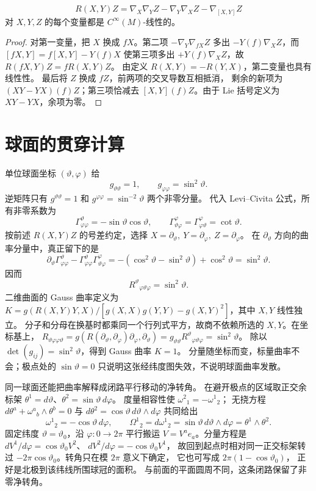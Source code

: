 \begin{proposition}[曲率的张量性]
\[
R(X,Y)Z=\nabla_X\nabla_YZ-\nabla_Y\nabla_XZ-\nabla_{[X,Y]}Z
\]
对 \(X,Y,Z\) 的每个变量都是 \(C^\infty(M)\)-线性的。
\end{proposition}
\begin{proof}
对第一变量，把 \(X\) 换成 \(fX\)。第二项
\(-\nabla_Y\nabla_{fX}Z\) 多出 \(-Y(f)\nabla_XZ\)，而
\([fX,Y]=f[X,Y]-Y(f)X\) 使第三项多出
\(+Y(f)\nabla_XZ\)，故 \(R(fX,Y)Z=fR(X,Y)Z\)。
由定义 \(R(X,Y)=-R(Y,X)\)，第二变量也具有线性性。
最后将 \(Z\) 换成 \(fZ\)，前两项的交叉导数互相抵消，
剩余的新项为 \((XY-YX)(f)Z\)；第三项恰减去
\([X,Y](f)Z\)。由于 Lie 括号定义为 \(XY-YX\)，余项为零。
\end{proof}

\section{球面的贯穿计算}

单位球面坐标 \((\vartheta,\varphi)\) 给
\[
g_{\vartheta\vartheta}=1,\qquad
g_{\varphi\varphi}=\sin^2\vartheta .
\]
逆矩阵只有 \(g^{\vartheta\vartheta}=1\) 和
\(g^{\varphi\varphi}=\sin^{-2}\vartheta\) 两个非零分量。
代入 Levi--Civita 公式，所有非零系数为
\[
\Gamma^\vartheta_{\varphi\varphi}
=-\sin\vartheta\cos\vartheta,\qquad
\Gamma^\varphi_{\vartheta\varphi}
=\Gamma^\varphi_{\varphi\vartheta}=\cot\vartheta.
\]
按前述 \(R(X,Y)Z\) 的号差约定，选择
\(X=\partial_\vartheta,\ Y=\partial_\varphi,\ Z=\partial_\varphi\)。
在 \(\partial_\vartheta\) 方向的曲率分量中，真正留下的是
\[
\partial_\vartheta\Gamma^\vartheta_{\varphi\varphi}
-\Gamma^\vartheta_{\varphi\varphi}
 \Gamma^\varphi_{\vartheta\varphi}
=-(\cos^2\vartheta-\sin^2\vartheta)+\cos^2\vartheta
=\sin^2\vartheta .
\]
因而
\[
R^\vartheta{}_{\varphi\vartheta\varphi}=\sin^2\vartheta.
\]
二维曲面的 Gauss 曲率定义为
\(K=g(R(X,Y)Y,X)/
[g(X,X)g(Y,Y)-g(X,Y)^2]\)，其中 \(X,Y\) 线性独立。
分子和分母在换基时都乘同一个行列式平方，故商不依赖所选的
\(X,Y\)。在坐标基上，
\(R_{\vartheta\varphi\varphi\vartheta}
=g(R(\partial_\vartheta,\partial_\varphi)\partial_\varphi,\partial_\vartheta)
=g_{\vartheta\vartheta}R^\vartheta{}_{\varphi\vartheta\varphi}
=\sin^2\vartheta\)。
除以 \(\det(g_{ij})=\sin^2\vartheta\)，得到 Gauss 曲率 \(K=1\)。
分量随坐标而变，标量曲率不会；极点处的 \(\sin\vartheta=0\)
只说明这张经纬度图失效，不说明球面曲率发散。

同一球面还能把曲率解释成闭路平行移动的净转角。
在避开极点的区域取正交余标架
\(\theta^1=d\vartheta\)、\(\theta^2=\sin\vartheta\,d\varphi\)。
度量相容性使 \(\omega^2{}_1=-\omega^1{}_2\)；
无挠方程 \(d\theta^a+\omega^a{}_b\wedge\theta^b=0\)
与 \(d\theta^2=\cos\vartheta\,d\vartheta\wedge d\varphi\)
共同给出
\[
\omega^1{}_2=-\cos\vartheta\,d\varphi,
\qquad
\Omega^1{}_2=d\omega^1{}_2
=\sin\vartheta\,d\vartheta\wedge d\varphi
=\theta^1\wedge\theta^2.
\]
固定纬度 \(\vartheta=\vartheta_0\)，沿 \(\varphi:0\to2\pi\)
平行搬运 \(V=V^ae_a\)。分量方程是
\(dV^1/d\varphi=\cos\vartheta_0 V^2\)、
\(dV^2/d\varphi=-\cos\vartheta_0 V^1\)，
故回到起点时相对同一正交标架转过
\(-2\pi\cos\vartheta_0\)。转角只在模 \(2\pi\) 意义下确定，
它也可写成 \(2\pi(1-\cos\vartheta_0)\)，
正好是北极到该纬线所围球冠的面积。
与前面的平面圆周不同，这条闭路保留了非零净转角。

